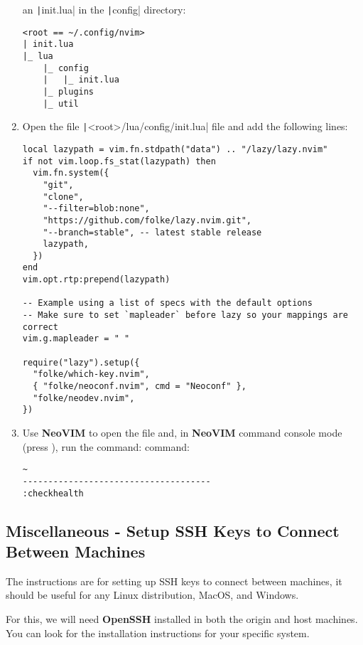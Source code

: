 \begin{enumerate}
    an \texttt|init.lua| in the \texttt|config| directory: 
    \begin{verbatim}
<root == ~/.config/nvim>
| init.lua
|_ lua
    |_ config
    |   |_ init.lua    
    |_ plugins
    |_ util
    \end{verbatim}
    \item Open the file \texttt|<root>/lua/config/init.lua| file and
    add the following lines:
    \begin{verbatim}
local lazypath = vim.fn.stdpath("data") .. "/lazy/lazy.nvim"
if not vim.loop.fs_stat(lazypath) then
  vim.fn.system({
    "git",
    "clone",
    "--filter=blob:none",
    "https://github.com/folke/lazy.nvim.git",
    "--branch=stable", -- latest stable release
    lazypath,
  })
end
vim.opt.rtp:prepend(lazypath)

-- Example using a list of specs with the default options
-- Make sure to set `mapleader` before lazy so your mappings are correct
vim.g.mapleader = " " 

require("lazy").setup({
  "folke/which-key.nvim",
  { "folke/neoconf.nvim", cmd = "Neoconf" },
  "folke/neodev.nvim",
})
    \end{verbatim}
    \item Use \textbf{NeoVIM} to open the file and, in \textbf{NeoVIM} command
    console mode (press ), run the command:
    command:
    \begin{verbatim}
~
-------------------------------------
:checkhealth
    \end{verbatim}
\end{enumerate}


\subsection{Miscellaneous - Setup SSH Keys to Connect Between Machines}

The instructions are for setting up SSH keys to connect between machines, it 
should be useful for any Linux distribution, MacOS, and Windows.\bigbreak

For this, we will need \textbf{OpenSSH} installed in both the origin and host
machines. You can look for the installation instructions for your specific
system.

